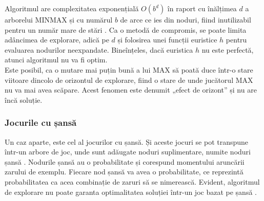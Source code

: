 \documentclass[12pt,twoside,a4paper,fleqn]{book}
\theoremstyle{definition}
\begin{document}
Algoritmul are complexitatea exponențială $O(b^{d})$ în raport cu înălțimea $d$ a arborelui MINMAX și cu numărul $b$ de arce ce ies din noduri, fiind inutilizabil pentru un număr mare de stări \cite{Allis, Giumale, Herik, Rivest}. Ca o metodă de compromis, se poate limita adâncimea de explorare, adică pe $d$ și folosirea unei funcții euristice $h$ pentru evaluarea nodurilor neexpandate. Bineînțeles, dacă euristica $h$ nu este perfectă, atunci algoritmul nu va fi optim.\\
Este posibil, ca o mutare mai puțin bună a lui MAX să poată duce într-o stare viitoare dincolo de orizontul de explorare, fiind o stare de unde jucătorul MAX nu va mai avea scăpare. Acest fenomen este denumit „efect de orizont” \cite{giumale} și nu are încă soluție.
\subsubsection{Jocurile cu șansă}
Un caz aparte, este cel al jocurilor cu șansă. Și aceste jocuri se pot transpune într-un arbore de joc, unde sunt adăugate noduri suplimentare, numite noduri șansă \cite{giumale}. Nodurile șansă au o probabilitate și corespund momentului aruncării zarului de exemplu. Fiecare nod șansă va avea o probabilitate, ce reprezintă probabilitatea ca acea combinație de zaruri să se nimerească. Evident, algoritmul de explorare nu poate garanta optimalitatea soluției într-un joc bazat pe șansă \cite{giumale}.
\end{document}
